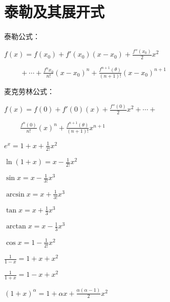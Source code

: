\section{泰勒及其展开式}

{
    \noindent 泰勒公式：

    $f(x) = f(x_0) + f'(x_0)(x-x_0) + \frac{f''(x_0)}{2} x^2$

    $\qquad \  + \cdots + \frac{f^{n}x_0}{n!} (x-x_0)^n + \frac{f^{n+1}(\theta)}{(n+1)!}(x - x_0)^{n+1}$
}


{
    \noindent 麦克劳林公式：

    $f(x) = f(0) + f'(0)(x) + \frac{f''(0)}{2} x^2 + \cdots +$

    $\qquad \ \frac{f^{n}(0)}{n!} (x)^n + \frac{f^{n+1}(\theta)}{(n+1)!}x^{n+1}$
}

\begin{multicols}{2}
    \begin{spacing}{\hangju}
        \noindent $e^x = 1 + x + \frac{1}{2!}x^2$

        \noindent $\ln{(1 + x)} = x - \frac{1}{2!}x^2$

        \noindent $\sin{x} = x - \frac{1}{3!}x^{3}$

        \noindent $\arcsin{x} = x + \frac{1}{3!}x^{3}$

        \noindent $\tan{x} = x + \frac{1}{3}x^3$

        \noindent $\arctan{x} = x - \frac{1}{3}x^3$

        \noindent $\cos{x} = 1 - \frac{1}{2!}x^2$

        \noindent $\frac{1}{1 - x} = 1 + x + x^2$

        \noindent $\frac{1}{1 + x} = 1 - x + x^2$

        \noindent $(1 + x)^\alpha = 1 + \alpha x + \frac{\alpha(\alpha - 1)}{2}x^2$
    \end{spacing}
\end{multicols}

